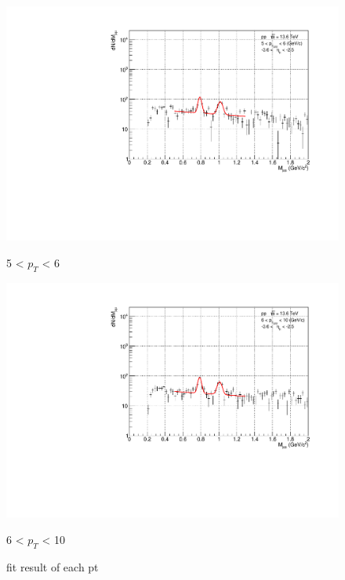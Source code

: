 \begin{figure}[H]
\begin{minipage}{0.45\textwidth}
                    \end{minipage}
                    \\
                    \vspace{1em}
                    \begin{minipage}{0.45\textwidth}
                        \centering
                        \includegraphics[width=\textwidth]{fig/3_4_2_fit_pt_5to6.pdf}
                        \captionsetup{labelformat=empty}
                        \caption*{5 < $p_{T}$ < 6}
                    \end{minipage}
                    \hfill
                    \begin{minipage}{0.45\textwidth}
                        \centering
                        \includegraphics[width=\textwidth]{fig/3_4_2_fit_pt_6to10.pdf}
                        \captionsetup{labelformat=empty}
                        \caption*{6 < $p_{T}$ < 10}
                    \end{minipage}
                    \caption{fit result of each pt}
                    \label{Analysis:Dimuon:Yield:fit}
                \end{figure}
